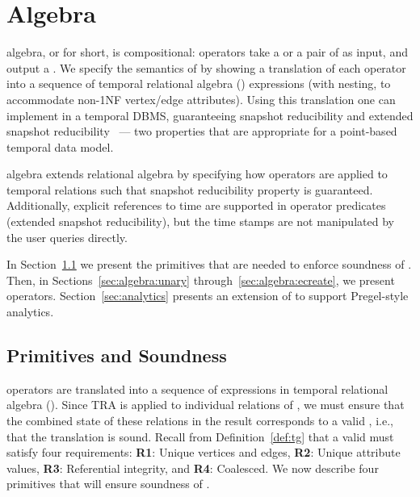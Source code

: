 \section{Algebra}
\label{sec:algebra}
\setlength{\textfloatsep}{5pt}%

\tg algebra, or \tga for short, is compositional: operators take a \tg
or a pair of \tgs as input, and output a \tg.  We specify the
semantics of \tga by showing a translation of each operator into a
sequence of temporal relational algebra (\tra) expressions (with
nesting, to accommodate non-1NF vertex/edge attributes).  Using this
translation one can implement \tga in a temporal DBMS, guaranteeing
snapshot reducibility and extended snapshot
reducibility~\cite{DBLP:reference/db/Bohlen092} --- two properties
that are appropriate for a point-based temporal data model.

\tra algebra extends relational algebra by specifying how operators
are applied to temporal relations such that snapshot reducibility
property is guaranteed.  Additionally, explicit references to time are
supported in operator predicates (extended snapshot reducibility), but
the time stamps are not manipulated by the user queries directly.



In Section~\ref{sec:algebra:integrity} we present the primitives that
are needed to enforce soundness of \tga.  Then, in
Sections~\ref{sec:algebra:unary} through~\ref{sec:algebra:ecreate}, we
present \tga operators.  Section~\ref{sec:analytics} presents an
extension of \tga to support Pregel-style analytics.  

\subsection{Primitives and Soundness}
\label{sec:algebra:integrity}

\tga operators are translated into a sequence of expressions in
temporal relational algebra (\tra).  Since TRA is applied to
individual relations of \tve, we must ensure that the combined state
of these relations in the result corresponds to a valid \tg, i.e.,
that the translation is sound.  Recall from Definition~\ref{def:tg}
that a valid \tg must satisfy four requirements: {\bf R1}: Unique
vertices and edges, {\bf R2}: Unique attribute values, {\bf R3}:
Referential integrity, and {\bf R4}: Coalesced.  We now describe four
primitives that will ensure soundness of \tga.

